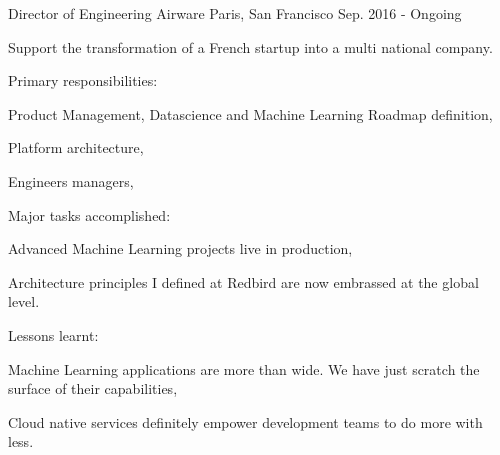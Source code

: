 

\begin{cventries}

  \cventry
    {Director of Engineering} %
    {Airware} %
    {Paris, San Francisco} %
    {Sep. 2016 - Ongoing} %
    {
      \begin{cvitems} %
        \item {Support the transformation of a French startup into a multi national company.}
        \item {Primary responsibilities:}
        \begin{cvsubitems}
          \item {Product Management, Datascience and Machine Learning Roadmap definition,}
          \item {Platform architecture,}
          \item {Engineers managers,}
        \end{cvsubitems}
        \item {Major tasks accomplished:}
        \begin{cvsubitems}
          \item {Advanced Machine Learning projects live in production,}
          \item {Architecture principles I defined at Redbird are now embrassed at the global level.}
        \end{cvsubitems}
        \item {Lessons learnt:}
        \begin{cvsubitems}
          \item {Machine Learning applications are more than wide. We have just scratch the surface of their capabilities,}
          \item {Cloud native services definitely empower development teams to do more with less.}
        \end{cvsubitems}
      \end{cvitems}
    }


\end{cventries}
